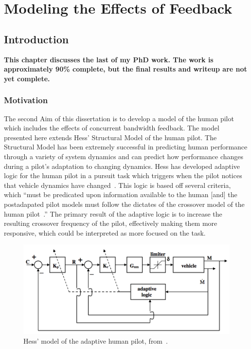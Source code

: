\chapter{Modeling the Effects of Feedback}
\label{chapter:modeling}


\section{Introduction}
\textbf{\color{red} This chapter discusses the last of my PhD work.
    The work is approximately 90\% complete, but the final results and writeup are not yet complete.}

\subsection{Motivation}
The second Aim of this dissertation is to develop a model of the human pilot which includes the effects of concurrent bandwidth feedback.
The model presented here extends Hess' Structural Model of the human pilot.
The Structural Model has been extremely successful in predicting human performance through a variety of system dynamics and can predict how performance changes during a pilot's adaptation to changing dynamics.
Hess has developed adaptive logic for the human pilot in a pursuit task which triggers when the pilot notices that vehicle dynamics have changed~\citep{hess_modeling_2009}.
This logic is based off several criteria, which ``must be predicated upon information available to the human [and] the postadapated pilot models must follow the dictates of the crossover model of the human pilot~\citep{hess_modeling_2009}.''
The primary result of the adaptive logic is to increase the resulting crossover frequency of the pilot, effectively making them more responsive, which could be interpreted as more focused on the task.

\begin{figure}[tb]
    \begin{center}
        \includegraphics[width=0.8\linewidth]{figures/Modeling/Screen_Shot_2018-08-09_at_4_15_24_PM.png}
        \caption[Hess' model of the adaptive human pilot]{Hess' model of the adaptive human pilot, from~\citet{hess_modeling_2009}.}
        \label{figure:hesspursuit}
    \end{center}
\end{figure}

